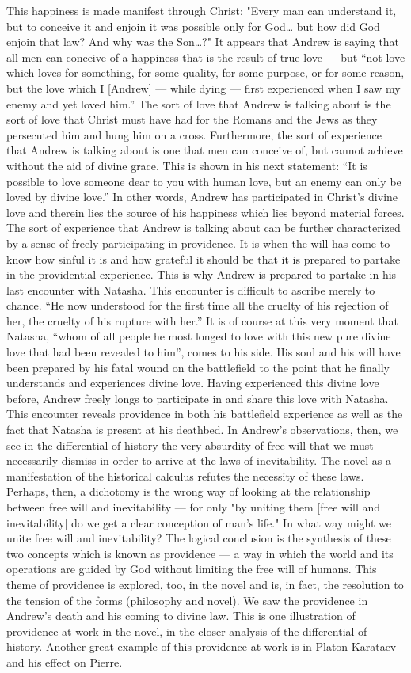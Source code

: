 This happiness is made manifest through Christ: "Every man can understand it, but to conceive it and enjoin it was possible only for God… but how did God enjoin that law?  And why was the Son…?" It appears that Andrew is saying that all men can conceive of a happiness that is the result of true love — but “not love which loves for something, for some quality, for some purpose, or for some reason, but the love which I [Andrew] — while dying — first experienced when I saw my enemy and yet loved him.”   The sort of love that Andrew is talking about is the sort of love that Christ must have had for the Romans and the Jews as they persecuted him and hung him on a cross. Furthermore, the sort of experience that Andrew is talking about is one that men can conceive of, but cannot achieve without the aid of divine grace. This is shown in his next statement: “It is possible to love someone dear to you with human love, but an enemy can only be loved by divine love.”  In other words, Andrew has participated in Christ’s divine love and therein lies the source of his happiness which lies beyond material forces.
The sort of experience that Andrew is talking about can be further characterized by a sense of freely participating in providence. It is when the will has come to know how sinful it is and how grateful it should be that it is prepared to partake in the providential experience. This is why Andrew is prepared to partake in his last encounter with Natasha. This encounter is difficult to ascribe merely to chance. “He now understood for the first time all the cruelty of his rejection of her, the cruelty of his rupture with her.” It is of course at this very moment that Natasha, “whom of all people he most longed to love with this new pure divine love that had been revealed to him”, comes to his side.  His soul and his will have been prepared by his fatal wound on the battlefield to the point that he finally understands and experiences divine love. Having experienced this divine love before, Andrew freely longs to participate in and share this love with Natasha. This encounter reveals providence in both his battlefield experience as well as the fact that Natasha is present at his deathbed.
In Andrew's observations, then, we see in the differential of history the very absurdity of free will that we must necessarily dismiss in order to arrive at the laws of inevitability.  The novel as a manifestation of the historical calculus refutes the necessity of these laws.  Perhaps, then, a dichotomy is the wrong way of looking at the relationship between free will and inevitability — for only "by uniting them [free will and inevitability] do we get a clear conception of man's life." In what way might we unite free will and inevitability?  The logical conclusion is the synthesis of these two concepts which is known as providence — a way in which the world and its operations are guided by God without limiting the free will of humans. This theme of providence is explored, too, in the novel and is, in fact, the resolution to the tension of the forms (philosophy and novel). We saw the providence in Andrew’s death and his coming to divine law. This is one illustration of providence at work in the novel, in the closer analysis of the differential of history. Another great example of this providence at work is in Platon Karataev and his effect on Pierre.
